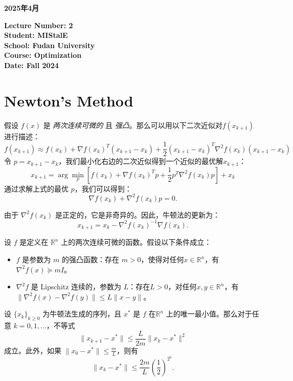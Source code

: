 	\newpage
	\begin{center}
		{\LARGE \textbf{2025年4月}}
	\end{center}
	\begin{tcolorbox}[colback=yellow!5!white, colframe=yellow!75!black, title=LectureInformation]
		\textbf{Lecture Number: 2} \\
		\textbf{Student: MIStalE} \\
		\textbf{School: Fudan University} \\
		\textbf{Course: Optimization} \\
		\textbf{Date: Fall 2024}
	\end{tcolorbox}
	\section{Newton's Method}
	假设 \( f(x) \) 是 \textit{两次连续可微的} 且 \textit{强凸}。那么可以用以下二次近似对\( f(x_{k+1}) \) 进行描述：
	\[
	f(x_{k+1})\approx f(x_k)+\nabla f(x_k)^T(x_{k+1}-x_k)+\frac{1}{2}(x_{k+1}-x_k)^T\nabla^2f(x_k)(x_{k+1}-x_k)
	\]
	令 \( p = x_{k+1} - x_k \)，我们最小化右边的二次近似得到一个近似的最优解\( x_{k+1} \)：\[
	x_{k+1} = \arg\min_p \left[ f(x_k) + \nabla f(x_k)^T p + \frac{1}{2} p^T \nabla^2 f(x_k) p
	\right] + x_k
	\]
	通过求解上式的最优 \( p \)，我们可以得到：
	\[
	\nabla f(x_k) + \nabla^2 f(x_k) p = 0. \]
	\begin{myanalysis}
		由于 \(\nabla^2 f(x_k)\) 是正定的，它是非奇异的。因此，牛顿法的更新为：\[
		x_{k+1} = x_k - \nabla^2 f(x_k)^{-1} \nabla f(x_k). \]
	\end{myanalysis}
	\begin{mytheorem}
		\label{thm:newton_convergence}
		设 \( f \) 是定义在 \( \mathbb{R}^n \) 上的两次连续可微的函数。假设以下条件成立：\begin{itemize}
			\item \( f \) 是参数为 \( m \) 的强凸函数：存在 \( m > 0 \)，使得对任何\( x \in\mathbb{R}^n \)，有 \( \nabla^2 f(x) \succeq mI \)。
			\item \( \nabla^2 f \) 是 Lipschitz 连续的，参数为 \( L \)：存在\( L > 0 \)，对任何\( x, y \in \mathbb{R}^n \)，有 \( \|\nabla^2 f(x) - \nabla^2 f(y)\| \leq L \|x - y\| \)。\end{itemize}
		设 \( \{x_k\}_{k \geq 0} \) 为牛顿法生成的序列，且 \( x^* \) 是 \( f \) 在\( \mathbb{R}^n\)
		上的唯一最小值。那么对于任意 \( k = 0, 1, \ldots \)，不等式
		\[
		\|x_{k+1} - x^*\| \leq \frac{L}{2m} \|x_k - x^*\|^2
		\]
		成立。此外，如果 \( \|x_0 - x^*\| \leq \frac{m}{L} \)，则有
		\[
		\|x_k - x^*\| \leq \frac{2m}{L} \left( \frac{1}{2} \right)^{2^k}. \]
	\end{mytheorem}
